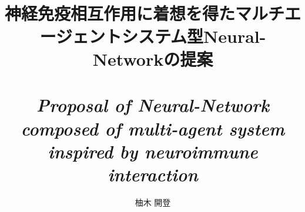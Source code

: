 \documentclass[10.5pt,a4j,dvipdfmx,openany]{jsbook}

\usepackage{algpseudocode}
\usepackage{algorithm}
\usepackage{wallpaper}
\usepackage{listings,jvlisting} 
\renewcommand{\figurename}{Fig. }
\renewcommand{\tablename}{Tab. }
\makeatletter
\renewcommand{\ALG@name}{Algorithm.}
\makeatother
\title{\LARGE{}\\\mbox{}\\
  神経免疫相互作用に着想を得たマルチエージェントシステム型Neural-Networkの提案\\ \mbox{}\\
\textit{Proposal of Neural-Network composed of multi-agent system inspired by neuroimmune interaction}}
\author{柚木 開登}


\maketitle

\tableofcontents
\listoftables
\listoffigures
\clearpage
\section*{あらまし}
Large-scale neural network training requires abundant computational resources by nature, but today, thanks to the development of cloud computing, it has become possible to construct and train large-scale models at low cost, resulting in the widespread adoption of machine learning in various product development and services.

However, such cloud-dependent machine learning inherently requires a large amount of learning data that can be reused for other product development, making it vulnerable to theft by malicious third parties or platform companies. Especially in recent years, as there is a demand for "personalized information," learning data often includes various personal information such as face photos, age, gender, beliefs, and hobbies, and the risk of leakage is significant.

Furthermore, since the revelation of the massive surveillance program by the US National Security Agency (NSA) in 2013, countries around the world have strengthened regulations related to personal information protection, including the EU's General Data Protection Regulation (GDPR), with a focus on giant IT companies. The treatment of personal information in machine learning is facing a reform.

